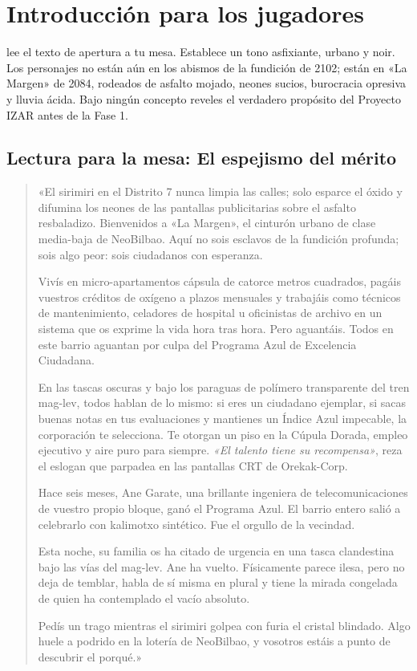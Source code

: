 \chapter{Introducción para los jugadores}

\begin{CajaSecreto}
 lee el texto de apertura a tu mesa. Establece un tono asfixiante, urbano y noir. Los personajes no están aún en los abismos de la fundición de 2102; están en «La Margen» de 2084, rodeados de asfalto mojado, neones sucios, burocracia opresiva y lluvia ácida. Bajo ningún concepto reveles el verdadero propósito del Proyecto IZAR antes de la Fase 1.
\end{CajaSecreto}

\section{Lectura para la mesa: El espejismo del mérito}


\begin{quote}
«El sirimiri en el Distrito 7 nunca limpia las calles; solo esparce el óxido y difumina los neones de las pantallas publicitarias sobre el asfalto resbaladizo. Bienvenidos a «La Margen», el cinturón urbano de clase media-baja de NeoBilbao. Aquí no sois esclavos de la fundición profunda; sois algo peor: sois ciudadanos con esperanza.

Vivís en micro-apartamentos cápsula de catorce metros cuadrados, pagáis vuestros créditos de oxígeno a plazos mensuales y trabajáis como técnicos de mantenimiento, celadores de hospital u oficinistas de archivo en un sistema que os exprime la vida hora tras hora. Pero aguantáis. Todos en este barrio aguantan por culpa del Programa Azul de Excelencia Ciudadana.

En las tascas oscuras y bajo los paraguas de polímero transparente del tren mag-lev, todos hablan de lo mismo: si eres un ciudadano ejemplar, si sacas buenas notas en tus evaluaciones y mantienes un Índice Azul impecable, la corporación te selecciona. Te otorgan un piso en la Cúpula Dorada, empleo ejecutivo y aire puro para siempre. \emph{«El talento tiene su recompensa»}, reza el eslogan que parpadea en las pantallas CRT de Orekak-Corp.

Hace seis meses, Ane Garate, una brillante ingeniera de telecomunicaciones de vuestro propio bloque, ganó el Programa Azul. El barrio entero salió a celebrarlo con kalimotxo sintético. Fue el orgullo de la vecindad.

Esta noche, su familia os ha citado de urgencia en una tasca clandestina bajo las vías del mag-lev. Ane ha vuelto. Físicamente parece ilesa, pero no deja de temblar, habla de sí misma en plural y tiene la mirada congelada de quien ha contemplado el vacío absoluto.

Pedís un trago mientras el sirimiri golpea con furia el cristal blindado. Algo huele a podrido en la lotería de NeoBilbao, y vosotros estáis a punto de descubrir el porqué.»
\end{quote}

